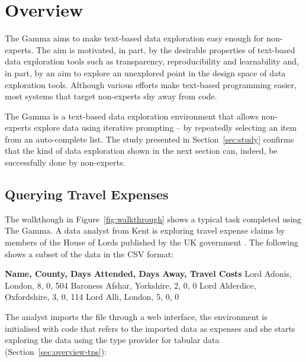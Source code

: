 \documentclass[manuscript,review,anonymous]{acmart}
\newcommand{\ikvd}[1]{{\fontfamily{zi4}\selectfont\small #1}}
\begin{document}

\section{Overview}
\label{sec:overview}

The Gamma aims to make text-based data exploration easy enough for non-experts. The aim is
motivated, in part, by the desirable properties of text-based data exploration tools such
as transparency, reproducibility and learnability and, in part, by an aim to explore an
unexplored point in the design space of data exploration tools. Although various efforts
make text-based programming easier, most systems that target non-experts shy away from code.

The Gamma is a text-based data exploration environment that allows non-experts explore data using
iterative prompting -- by repeatedly selecting an item from an auto-complete list. The study
presented in Section~\ref{sec:study} confirms that the kind of data exploration shown in the next
section can, indeed, be successfully done by non-experts.
%
\subsection{Querying Travel Expenses}
\label{sec:overview-walk}

The walkthough in Figure~\ref{fig:walkthrough} shows a typical task completed using The Gamma.
A data analyst from Kent is exploring travel expense claims by members of the House of Lords published
by the UK government \cite{lords}. The following shows a subset of the data in the CSV format:


\begin{thegamma}
\textbf{Name, County, Days Attended, Days Away, Travel Costs}
Lord Adonis, London, 8, 0, 504
Baroness Afshar, Yorkshire, 2, 0, 0
Lord Alderdice, Oxfordshire, 3, 0, 114
Lord Alli, London, 5, 0, 0
\end{thegamma}

\noindent
The analyst imports the file through a web interface, the environment is initialised with code
that refers to the imported data as \ikvd{expenses} and she starts exploring the data using the type provider for tabular data (Section~\ref{sec:overview-tps}):
\end{document}
